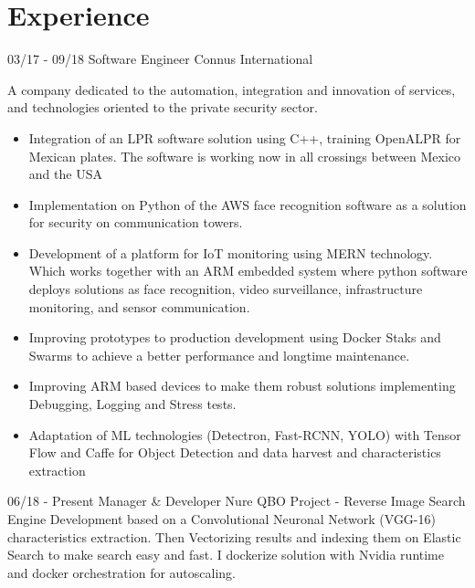 \documentclass[]{friggeri-cv}
\begin{document}
\section{Experience}
\begin{entrylist}
  \entry
    {03/17 - 09/18}
    {Software Engineer}
    {Connus International}
    {A company dedicated to the automation, integration and innovation of services, and technologies oriented to the private security sector.\\\vspace{-3mm}
    \begin{itemize}
    \addtolength{\itemindent}{-4mm}
    	\item Integration of an LPR software solution using C++, training OpenALPR for Mexican plates. The software is working now in all crossings between Mexico and the USA\vspace{1mm}
    	\item Implementation on Python of the AWS face recognition software as a solution for security on communication towers.\vspace{1mm}
    	\item Development of a platform for IoT monitoring using MERN technology. Which works together with an ARM embedded system where python software deploys solutions as face recognition, video surveillance, infrastructure monitoring, and sensor communication.\vspace{1mm}
		\item Improving prototypes to production development using Docker Staks and Swarms to achieve a better performance and longtime maintenance.\vspace{1mm}
		\item Improving ARM based devices to make them robust solutions implementing Debugging, Logging and Stress tests.\vspace{1mm}
		\item Adaptation of ML technologies (Detectron, Fast-RCNN, YOLO) with Tensor Flow  and Caffe for Object Detection and data harvest and characteristics extraction\vspace{1mm}
	\end{itemize}
    }
  \entry
    {06/18 - Present}
    {Manager \& Developer}
    {Nure\vspace{1mm}}
    {QBO Project - Reverse Image Search Engine Development based on a Convolutional Neuronal Network (VGG-16) characteristics extraction. Then Vectorizing results and indexing them on Elastic Search to make search easy and fast. I dockerize solution with Nvidia runtime and docker orchestration for autoscaling.\vspace{-2mm}\\}

\end{entrylist}
\end{document}
